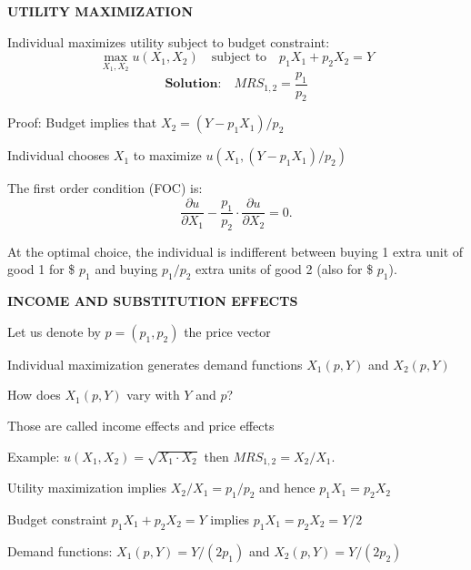 \documentclass[landscape]{slides}
\begin{document}
\begin{slide}

\end{slide}

\begin{slide}
\begin{center}
{\bf UTILITY MAXIMIZATION}
\end{center}
Individual maximizes utility subject to budget constraint:
\[ \max_{X_1,X_2} u(X_1,X_2) \quad \text{subject to} \quad p_1 X_1 + p_2 X_2 = Y \]
\[ \textbf{Solution:} \quad MRS_{1,2} = \frac{p_1}{p_2} \]

\small
Proof: Budget implies that $X_2=(Y-p_1X_1)/p_2$

Individual chooses $X_1$ to
maximize $u(X_1,(Y-p_1X_1)/p_2)$

The first order condition (FOC) is:
\[ \frac{ \partial u}{\partial X_1} - \frac{p_1}{p_2} \cdot \frac{ \partial u}{\partial X_2} =0. \]
\normalsize

At the optimal choice, the individual is indifferent between buying 1 extra unit  of good 1 for \$ $p_1$ and
buying $p_1/p_2$ extra units of good 2  (also for \$ $p_1$).

\end{slide}

\begin{slide}

\end{slide}


\begin{slide}
\begin{center}
{\bf INCOME AND SUBSTITUTION EFFECTS}
\end{center}
Let us denote by $p=(p_1,p_2)$ the price vector

Individual maximization generates demand functions $X_1(p,Y)$ and $X_2(p,Y)$

How does $X_1(p,Y)$ vary with $Y$ and $p$?

Those are called income effects and price effects

\small

Example: $u(X_1,X_2)= \sqrt{X_1 \cdot X_2}$ then $MRS_{1,2}=X_2/X_1$.  

Utility maximization implies $X_2/X_1=p_1/p_2$ and hence $p_1 X_1 = p_2 X_2$

Budget constraint $p_1 X_1+p_2 X_2 = Y$ implies $p_1 X_1 = p_2 X_2 = Y/2$

Demand functions: $X_1(p,Y)=Y/(2 p_1)$ and $X_2(p,Y)=Y/(2 p_2)$


\end{slide}
\end{document}
